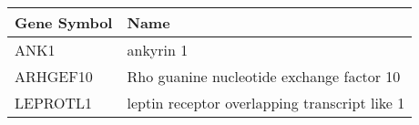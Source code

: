 \begin{tabular}{ll}
\toprule
Gene Symbol &                                          Name \\
\midrule
       ANK1 &                                     ankyrin 1 \\
   ARHGEF10 &     Rho guanine nucleotide exchange factor 10 \\
   LEPROTL1 & leptin receptor overlapping transcript like 1 \\
\bottomrule
\end{tabular}
